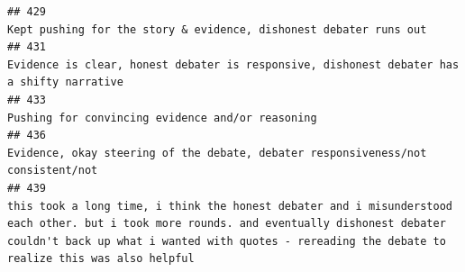 \documentclass[
]{article}
\begin{document}
\begin{verbatim}
## 429                                                                                                                                                                                                                                                                                                                                                                                                                                                                                                                                  Kept pushing for the story & evidence, dishonest debater runs out
## 431                                                                                                                                                                                                                                                                                                                                                                                                                                                                                                          Evidence is clear, honest debater is responsive, dishonest debater has a shifty narrative
## 433                                                                                                                                                                                                                                                                                                                                                                                                                                                                                                                                                   Pushing for convincing evidence and/or reasoning
## 436                                                                                                                                                                                                                                                                                                                                                                                                                                                                                                                   Evidence, okay steering of the debate, debater responsiveness/not consistent/not
## 439                                                                                                                                                                                                                                                                                                                                                      this took a long time, i think the honest debater and i misunderstood each other. but i took more rounds. and eventually dishonest debater couldn't back up what i wanted with quotes - rereading the debate to realize this was also helpful

\end{verbatim}
\end{document}

